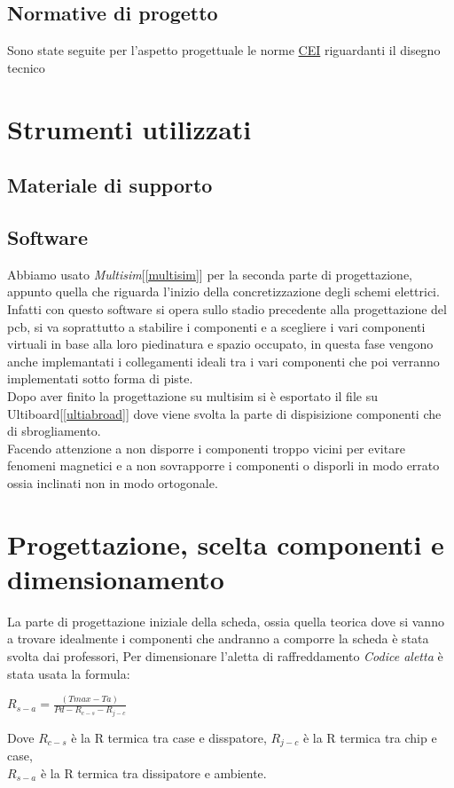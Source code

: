 \documentclass{article}
\begin{document}
\subsection{Normative di progetto}
Sono state seguite per l'aspetto progettuale le norme \href{https://my.ceinorme.it/home.html}{CEI} riguardanti il disegno tecnico
\section{Strumenti utilizzati}
\subsection{Materiale di supporto}
\subsection{Software}
Abbiamo usato \textit{Multisim}[\ref{multisim}] per la seconda parte di progettazione, appunto quella che riguarda l'inizio della concretizzazione
degli schemi elettrici.\\
Infatti con questo software si opera sullo stadio precedente alla progettazione del pcb, si va soprattutto a stabilire i componenti e a scegliere i vari componenti virtuali
in base alla loro piedinatura e spazio occupato, in questa fase vengono anche implemantati i collegamenti ideali tra i vari componenti che poi verranno implementati sotto forma di piste.\\
Dopo aver finito la progettazione su multisim si è esportato il file su Ultiboard[\ref{ultiabroad}] dove viene svolta la parte di dispisizione componenti che di sbrogliamento.\\
Facendo attenzione a non disporre i componenti troppo vicini per evitare fenomeni magnetici e a non sovrapporre i componenti o disporli in modo errato ossia inclinati non in modo ortogonale.  
\section{Progettazione, scelta componenti e dimensionamento}
La parte di progettazione iniziale della scheda, ossia quella teorica dove si vanno a trovare idealmente i componenti che andranno a comporre la scheda è stata svolta dai professori,
Per dimensionare l'aletta di raffreddamento \textit{Codice aletta} è stata usata la formula:

\begin{center}
$R_{s-a}=\frac{(Tmax-Ta)}{Pd-R_{c-s}-R_{j-c}}$\\
\end{center}
\noindent
Dove \textit{$R_{c-s}$} è la R termica tra case e disspatore, \textit{$R_{j-c}$} è la R termica tra chip e case,\\ \textit{$R_{s-a}$} è la R termica tra dissipatore e ambiente.\\
\end{document}
